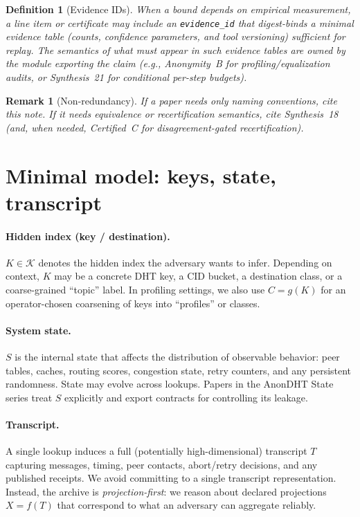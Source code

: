 \documentclass[11pt]{article}
\newtheorem{definition}{Definition}
\newtheorem{remark}{Remark}
\begin{document}
\begin{definition}[Evidence IDs]
When a bound depends on empirical measurement, a line item or certificate may include an \texttt{evidence\_id} that digest-binds a minimal evidence table (counts, confidence parameters, and tool versioning) sufficient for replay.
The semantics of what must appear in such evidence tables are owned by the module exporting the claim (e.g., Anonymity~B for profiling/equalization audits, or Synthesis~21 for conditional per-step budgets).\cite{series:condcert}
\end{definition}


\begin{remark}[Non-redundancy]
If a paper needs only \emph{naming} conventions, cite this note.
If it needs \emph{equivalence} or \emph{recertification} semantics, cite Synthesis~18 (and, when needed, Certified~C for disagreement-gated recertification).
\end{remark}
\section{Minimal model: keys, state, transcript}
\paragraph{Hidden index (key / destination).}
$K\in\mathcal K$ denotes the hidden index the adversary wants to infer.
Depending on context, $K$ may be a concrete DHT key, a CID bucket, a destination class, or a coarse-grained ``topic'' label.
In profiling settings, we also use $C=g(K)$ for an operator-chosen coarsening of keys into ``profiles'' or classes.

\paragraph{System state.}
$S$ is the internal state that affects the distribution of observable behavior:
peer tables, caches, routing scores, congestion state, retry counters, and any persistent randomness.
State may evolve across lookups.
Papers in the AnonDHT State series treat $S$ explicitly and export contracts for controlling its leakage.\cite{series:state1,series:state3}

\paragraph{Transcript.}
A single lookup induces a full (potentially high-dimensional) transcript $T$ capturing messages, timing, peer contacts, abort/retry decisions, and any published receipts.
We avoid committing to a single transcript representation.
Instead, the archive is \emph{projection-first}:
we reason about declared projections $X=f(T)$ that correspond to what an adversary can aggregate reliably.
\end{document}
